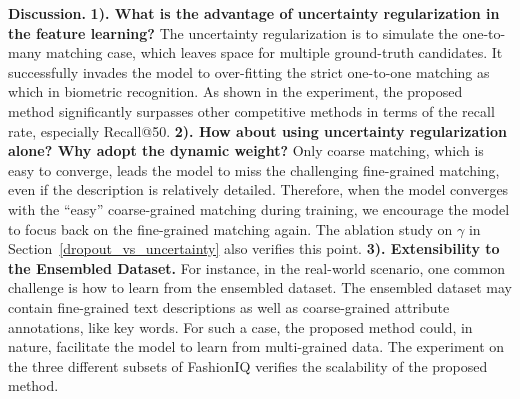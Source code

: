 \documentclass[10pt,twocolumn,letterpaper]{article}
\begin{document}
\noindent\textbf{Discussion.} 
\textbf{1). What is the advantage of uncertainty regularization in the feature learning?} The uncertainty regularization is to simulate the one-to-many matching case, which leaves space for multiple ground-truth candidates. It successfully invades the model to over-fitting the strict one-to-one matching as which in biometric recognition. As shown in the experiment, the proposed method significantly surpasses other competitive methods in terms of the recall rate, especially Recall@50.
\textbf{2). How about using uncertainty regularization alone?  Why adopt the dynamic weight?} Only coarse matching, which is easy to converge, leads the model to miss the challenging fine-grained matching, even if the description is relatively detailed. 
Therefore, when the model converges with the ``easy'' coarse-grained matching during training, we encourage the model to focus back on the fine-grained matching again. The ablation study on $\gamma$ in Section~\ref{dropout_vs_uncertainty} also verifies this point.
\textbf{3). Extensibility to the Ensembled Dataset.}  
For instance, in the real-world scenario, one common challenge is how to learn from the ensembled dataset. The ensembled dataset may contain fine-grained text descriptions as well as coarse-grained attribute annotations, like key words. 
For such a case, the proposed method could, in nature, facilitate the model to learn from multi-grained data. The experiment on the three different subsets of FashionIQ verifies the scalability of the proposed method.
\end{document}
